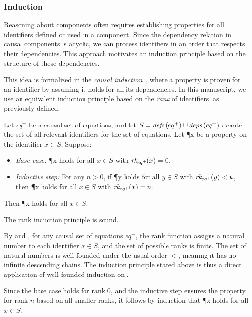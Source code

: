 \subsubsection{Induction}
\label{sec:semantics:grsync:causality:induction}

Reasoning about \GRSync components often requires establishing properties for all identifiers
defined or used in a component. Since the dependency relation in causal components is acyclic, we
can process identifiers in an order that respects their dependencies. This approach motivates an
induction principle based on the structure of these dependencies.

This idea is formalized in the \emph{causal induction}~\cite{bourke:hal-03936656}, where a property
is proven for an identifier by assuming it holds for all its dependencies. In this manuscript, we
use an equivalent induction principle based on the \emph{rank} of identifiers, as previously
defined.

\begin{definition}
    \label{def:semantics:grsync:causality:induction:rank}
    Let $eq^+$ be a causal set of equations, and let $S = {\textit{defs}\left(eq^+\right)} \cup {\ensuremath{\textit{deps}\left(eq^+\right)}}$ denote the
    set of all relevant identifiers for the set of equations.
    Let \P{x} be a property on the identifier $x \in S$.
    Suppose:
    \begin{itemize}
        \item \textit{Base case:} \P{x} holds for all $x \in S$ with ${\textit{rk}_{eq^+}(x)} = 0$.
        \item \textit{Inductive step:} For any $n > 0$, if \P{y} holds for all $y \in S$ with
              ${\textit{rk}_{eq^+}(y)} < n$, then \P{x} holds for all $x \in S$ with ${\textit{rk}_{eq^+}(x)} = n$.
    \end{itemize}
    Then \P{x} holds for all $x \in S$.
\end{definition}

\begin{lemma}
    \label{lem:semantics:grsync:causality:induction:soundness}
    The rank induction principle is sound.
\end{lemma}
\begin{skippableproof}
    By  and
    , for any causal set of equations $eq^+$, the
    rank function  assigns a natural number to each identifier $x \in S$, and the set
    of possible ranks is finite.
    The set of natural numbers \N is well-founded under the usual order $<$, meaning it has no
    infinite descending chains. The induction principle stated above is thus a direct application
    of well-founded induction on \N.

    Since the base case holds for rank $0$, and the inductive step ensures the property for rank
    $n$ based on all smaller ranks, it follows by induction that \P{x} holds for all $x \in S$.
\end{skippableproof}

